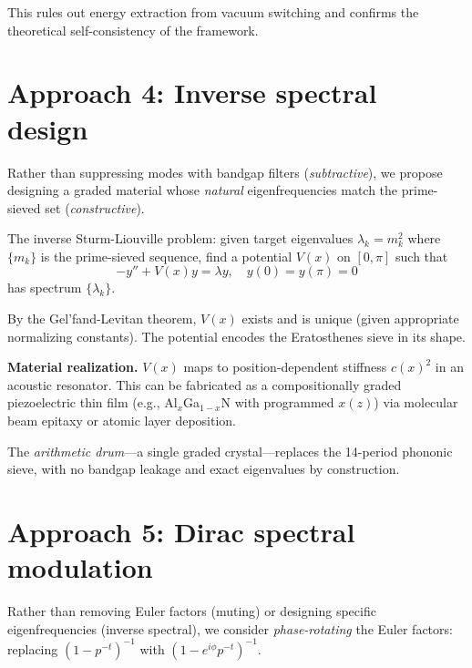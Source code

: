 \documentclass[aps,prd,twocolumn,superscriptaddress,nofootinbib]{revtex4-2}
\begin{document}
This rules out energy extraction from vacuum switching
and confirms the theoretical self-consistency of the framework.

\section{Approach 4: Inverse spectral design}
\label{sec:inverse}

Rather than suppressing modes with bandgap filters (\emph{subtractive}),
we propose designing a graded material whose \emph{natural}
eigenfrequencies match the prime-sieved set (\emph{constructive}).

The inverse Sturm-Liouville problem: given target eigenvalues
$\lambda_k = m_k^2$ where $\{m_k\}$ is the prime-sieved sequence,
find a potential $V(x)$ on $[0, \pi]$ such that
\begin{equation}
  -y'' + V(x) y = \lambda y, \quad y(0) = y(\pi) = 0
\end{equation}
has spectrum $\{\lambda_k\}$.

By the Gel'fand-Levitan theorem, $V(x)$ exists and is unique
(given appropriate normalizing constants).
The potential encodes the Eratosthenes sieve in its shape.

\textbf{Material realization.}
$V(x)$ maps to position-dependent stiffness $c(x)^2$ in an acoustic
resonator. This can be fabricated as a compositionally graded
piezoelectric thin film (e.g., Al$_x$Ga$_{1-x}$N with programmed $x(z)$)
via molecular beam epitaxy or atomic layer deposition.

The \emph{arithmetic drum}---a single graded crystal---replaces the
14-period phononic sieve, with no bandgap leakage and exact eigenvalues
by construction.

\section{Approach 5: Dirac spectral modulation}
\label{sec:dirac}

Rather than removing Euler factors (muting) or designing specific
eigenfrequencies (inverse spectral), we consider \emph{phase-rotating}
the Euler factors: replacing $(1 - p^{-t})^{-1}$ with
$(1 - e^{i\phi} p^{-t})^{-1}$.
\end{document}
